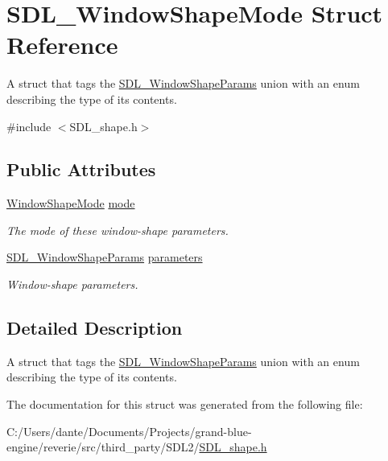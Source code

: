 \hypertarget{struct_s_d_l___window_shape_mode}{}\section{S\+D\+L\+\_\+\+Window\+Shape\+Mode Struct Reference}
\label{struct_s_d_l___window_shape_mode}


A struct that tags the \mbox{\hyperlink{union_s_d_l___window_shape_params}{S\+D\+L\+\_\+\+Window\+Shape\+Params}} union with an enum describing the type of its contents.  




{\ttfamily \#include $<$S\+D\+L\+\_\+shape.\+h$>$}

\subsection*{Public Attributes}
\begin{DoxyCompactItemize}
\item 
\mbox{\label{struct_s_d_l___window_shape_mode_a40ebd8b9a76d982cbd87563386cc05de}} 
\mbox{\hyperlink{_s_d_l__shape_8h_aa30948f2699e316a43b740eccebe5c20}{Window\+Shape\+Mode}} \mbox{\hyperlink{struct_s_d_l___window_shape_mode_a40ebd8b9a76d982cbd87563386cc05de}{mode}}
\begin{DoxyCompactList}\small\item\em The mode of these window-\/shape parameters. \end{DoxyCompactList}\item 
\mbox{\label{struct_s_d_l___window_shape_mode_a2f79bb294034156207fa6d88d3a8c819}} 
\mbox{\hyperlink{union_s_d_l___window_shape_params}{S\+D\+L\+\_\+\+Window\+Shape\+Params}} \mbox{\hyperlink{struct_s_d_l___window_shape_mode_a2f79bb294034156207fa6d88d3a8c819}{parameters}}
\begin{DoxyCompactList}\small\item\em Window-\/shape parameters. \end{DoxyCompactList}\end{DoxyCompactItemize}


\subsection{Detailed Description}
A struct that tags the \mbox{\hyperlink{union_s_d_l___window_shape_params}{S\+D\+L\+\_\+\+Window\+Shape\+Params}} union with an enum describing the type of its contents. 

The documentation for this struct was generated from the following file\+:\begin{DoxyCompactItemize}
\item 
C\+:/\+Users/dante/\+Documents/\+Projects/grand-\/blue-\/engine/reverie/src/third\+\_\+party/\+S\+D\+L2/\mbox{\hyperlink{_s_d_l__shape_8h}{S\+D\+L\+\_\+shape.\+h}}\end{DoxyCompactItemize}
